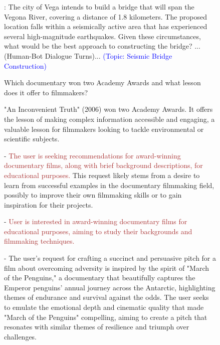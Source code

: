 \begin{figure}[htb]
\begin{tcolorbox}[left=3pt,right=3pt,top=3pt,bottom=3pt,title=\textbf{Conversation History:}]
[human]: The city of Vega intends to build a bridge that will span the Vegona River, covering a distance of 1.8 kilometers. The proposed location falls within a seismically active area that has experienced several high-magnitude earthquakes. Given these circumstances, what would be the best approach to constructing the bridge? ... (Human-Bot Dialogue Turns)...  \textcolor{blue}{(Topic: Seismic Bridge Construction)}
\end{tcolorbox}
\begin{tcolorbox}[left=3pt,right=3pt,top=3pt,bottom=3pt,title=\textbf{Question:}]
Which documentary won two Academy Awards and what lesson does it offer to filmmakers?
\end{tcolorbox}
\begin{tcolorbox}[left=3pt,right=3pt,top=3pt,bottom=3pt,title=\textbf{Ground-Truth Answer:}]
"An Inconvenient Truth" (2006) won two Academy Awards. It offers the lesson of making complex information accessible and engaging, a valuable lesson for filmmakers looking to tackle environmental or scientific subjects.
\end{tcolorbox}
\begin{tcolorbox}[left=3pt,right=3pt,top=3pt,bottom=3pt,title=\textbf{Memory generated by ConditionMem~\citep{yuan2023evolving}:}]
- \textcolor{brown}{The user is seeking recommendations for award-winning documentary films, along with brief background descriptions, for educational purposes.} This request likely stems from a desire to learn from successful examples in the documentary filmmaking field, possibly to improve their own filmmaking skills or to gain inspiration for their projects. 

- \textcolor{brown}{User is interested in award-winning documentary films for educational purposes, aiming to study their backgrounds and filmmaking techniques.}

- The user's request for crafting a succinct and persuasive pitch for a film about overcoming adversity is inspired by the spirit of "March of the Penguins," a documentary that beautifully captures the Emperor penguins' annual journey across the Antarctic, highlighting themes of endurance and survival against the odds. The user seeks to emulate the emotional depth and cinematic quality that made "March of the Penguins" compelling, aiming to create a pitch that resonates with similar themes of resilience and triumph over challenges. 


\end{tcolorbox}
\end{figure}
